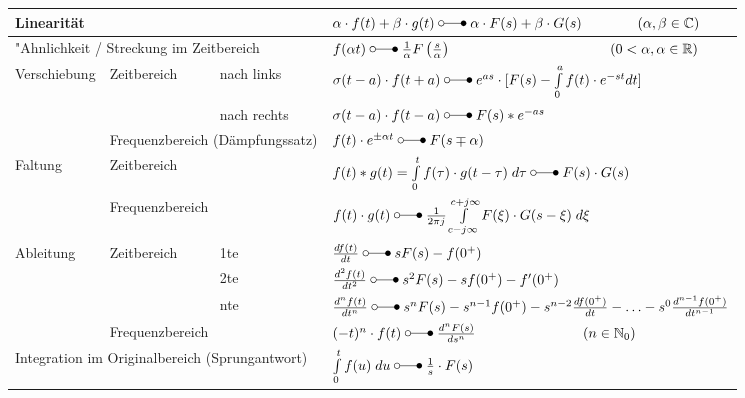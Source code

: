 		
		
	  \renewcommand{\arraystretch}{2}
		\begin{tabular}{|p{2.5cm}|p{3cm}|p{2.5cm}p{10cm}|}
			\hline
				\multicolumn{3}{|l}{Linearität}   &  $\alpha\cdot f(t) + \beta\cdot g(t) \; \laplace \; \alpha\cdot F(s) + \beta\cdot G(s) \qquad\qquad (\alpha, \beta \in\mathbb{C})$ \\ 
			\hline
				\multicolumn{3}{|l}{"Ahnlichkeit / Streckung im Zeitbereich}   &  $f(\alpha t) \; \laplace \; \frac{1}{\alpha}F \left (\frac{s}{\alpha} \right ) \hspace{4cm} (0 <\alpha, \alpha \in\mathbb{R})$ \\
			\hline
			\hline
				\multirow{3}{*}{Verschiebung} & \multirow{2}{*}{Zeitbereich} & nach links &  $\sigma(t-a) \cdot f(t + a) \; \laplace \; e^{as} \cdot [F(s) - \int\limits_0^{a} f(t) \cdot e^{-st} dt]$	 \\ \cline{3-4} 
				&  & nach rechts  & $\sigma(t-a) \cdot f(t - a) \; \laplace \; F(s)*e^{-as}$ \\ \cline{2-4}
				& \multicolumn{2}{l}{Frequenzbereich (Dämpfungssatz)} & $f(t) \cdot e^{\pm\alpha t} \; \laplace \; F(s\mp\alpha)$\\ 
			\hline
			\hline
				\multirow{2}{*}{Faltung} & \multicolumn{2}{l}{Zeitbereich} & $f(t) \ast g(t) = \int\limits_{0}^{t} f(\tau) \cdot g(t-\tau) \; d\tau \; \laplace \; F(s)
				\cdot G(s)$ \\ \cline{2-4} 
				& \multicolumn{2}{l}{Frequenzbereich} &  $f(t) \cdot g(t) \; \laplace \; \frac{1}{2\pi j}\int\limits_{c-j\infty}^{c+j\infty}
				F(\xi) \cdot G(s-\xi) \; d\xi$\\ 
			\hline
			\hline
				\multirow{4}{*}{Ableitung} & \multirow{3}{*}{Zeitbereich} & 1te & 	$\frac{d f(t)}{d t} \; \laplace \; sF(s)-f(0^+)$ \\ \cline{3-4}
				&  & 2te  &  $\frac{d^2 f(t)}{d t^2} \; \laplace \; s^2F(s)		-sf(0^+) -f'(0^+)$\\ \cline{3-4}
				&  & nte  &  $\frac{d^n f(t)}{d t^n} \; \laplace \; s^nF(s)
				-s^{n-1}f(0^+)-s^{n-2}\frac{d f(0^+)}{d t}-\ldots
				-s^0\frac{d^{n-1} f(0^+)}{d t^{n-1}}$\\ \cline{2-4} 
				& \multicolumn{2}{l}{Frequenzbereich} & $(-t)^n \cdot f(t) \; \laplace \;  \frac{d^n F(s)}{d s^n} \qquad \hspace{2cm} (n \in \mathbb{N}_0)$\\
			\hline
			\hline
				\multicolumn{3}{|l}{Integration im Originalbereich (Sprungantwort)}   &  $\int\limits_0^t f(u) \; du \; \laplace \; \frac{1}{s}\cdot F(s)$ \\

\end{tabular}
